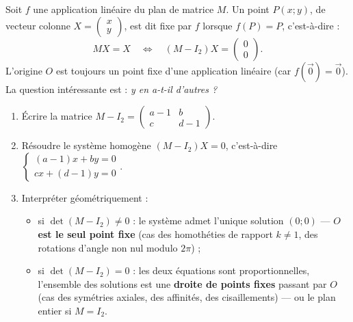 \documentclass[11pt]{article}
\newcommand{\cle}[1]{{\popxbold\color{popdark}#1}}
\begin{document}
\begin{definition}
Soit $f$ une application linéaire du plan de matrice $M$. Un point $P(x;y)$, de vecteur colonne $X = \begin{pmatrix} x \\ y \end{pmatrix}$, est dit \cle{fixe} par $f$ lorsque $f(P) = P$, c'est-à-dire :
\[ MX = X \quad \Longleftrightarrow \quad (M - I_2)X = \begin{pmatrix} 0 \\ 0 \end{pmatrix}. \]
L'origine $O$ est toujours un point fixe d'une application linéaire (car $f(\vec{0}) = \vec{0}$). La question intéressante est : \emph{y en a-t-il d'autres ?}
\end{definition}

\begin{methode}
\begin{enumerate}
\item Écrire la matrice $M - I_2 = \begin{pmatrix} a-1 & b \\ c & d-1 \end{pmatrix}$.
\item Résoudre le système homogène $(M - I_2)X = 0$, c'est-à-dire $\begin{cases} (a-1)x + by = 0 \\ cx + (d-1)y = 0 \end{cases}$.
\item Interpréter géométriquement :
\begin{itemize}
\item si $\det(M - I_2) \neq 0$ : le système admet l'unique solution $(0;0)$ — \textbf{$O$ est le seul point fixe} (cas des homothéties de rapport $k \neq 1$, des rotations d'angle non nul modulo $2\pi$) ;
\item si $\det(M - I_2) = 0$ : les deux équations sont proportionnelles, l'ensemble des solutions est une \textbf{droite de points fixes} passant par $O$ (cas des symétries axiales, des affinités, des cisaillements) — ou le plan entier si $M = I_2$.
\end{itemize}
\end{enumerate}
\end{methode}
\end{document}
